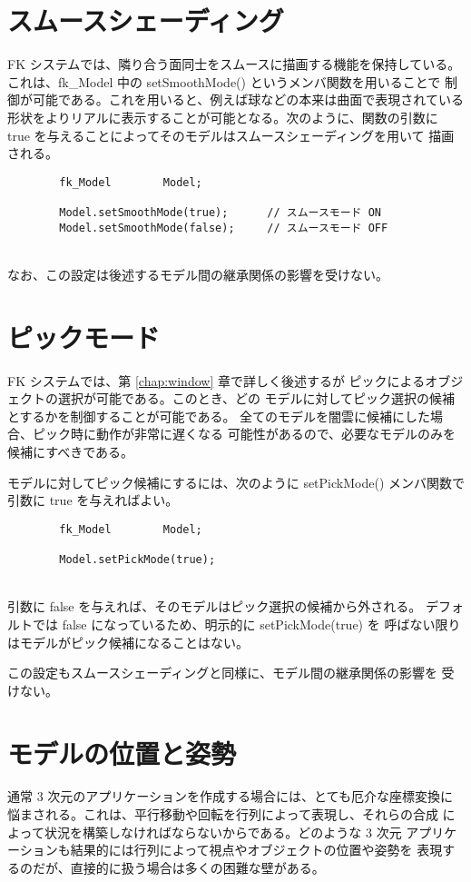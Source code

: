 \section{スムースシェーディング} \label{sec:smooth}
FK システムでは、隣り合う面同士をスムースに描画する機能を保持している。
これは、fk\_Model 中の setSmoothMode() というメンバ関数を用いることで
制御が可能である。これを用いると、例えば球などの本来は曲面で表現されている
形状をよりリアルに表示することが可能となる。次のように、関数の引数に
true を与えることによってそのモデルはスムースシェーディングを用いて
描画される。
\\
\begin{screen}
\begin{verbatim}
        fk_Model        Model;

        Model.setSmoothMode(true);      // スムースモード ON
        Model.setSmoothMode(false);     // スムースモード OFF
\end{verbatim}
\end{screen}
~ \\
なお、この設定は後述するモデル間の継承関係の影響を受けない。
\section{ピックモード}
FK システムでは、第 \ref{chap:window} 章で詳しく後述するが
ピックによるオブジェクトの選択が可能である。このとき、どの
モデルに対してピック選択の候補とするかを制御することが可能である。
全てのモデルを闇雲に候補にした場合、ピック時に動作が非常に遅くなる
可能性があるので、必要なモデルのみを候補にすべきである。

モデルに対してピック候補にするには、次のように setPickMode() メンバ関数で
引数に true を与えればよい。
\\
\begin{screen}
\begin{verbatim}
        fk_Model        Model;

        Model.setPickMode(true);
\end{verbatim}
\end{screen}
~ \\
引数に false を与えれば、そのモデルはピック選択の候補から外される。
デフォルトでは false になっているため、明示的に setPickMode(true) を
呼ばない限りはモデルがピック候補になることはない。

この設定もスムースシェーディングと同様に、モデル間の継承関係の影響を
受けない。
\section{モデルの位置と姿勢}
通常 3 次元のアプリケーションを作成する場合には、とても厄介な座標変換に
悩まされる。これは、平行移動や回転を行列によって表現し、それらの合成
によって状況を構築しなければならないからである。どのような 3 次元
アプリケーションも結果的には行列によって視点やオブジェクトの位置や姿勢を
表現するのだが、直接的に扱う場合は多くの困難な壁がある。

